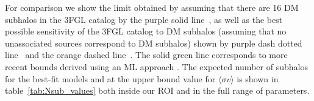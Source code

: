 \documentclass[12pt, a4paper]{article}
\newcommand{\dima}[1]{\textcolor{purple}{{Dima: #1}}}
\begin{document}

For comparison we show the limit obtained by assuming that there are 16 DM subhalos in the 3FGL catalog by the purple solid line~\cite{2019Galax...7...90C},
as well as the best possible sensitivity of the 3FGL catalog to DM subhalos (assuming that no unassociated sources correspond to DM subhalos) shown by purple dash dotted line~\cite{2019Galax...7...90C}
and the orange dashed line~\cite{2019JCAP...11..045C}. The solid green line corresponds to more recent bounds derived using an ML approach \cite{2023JCAP...07..033B}. 
The expected number of subhalos for the best-fit models and at the upper bound value for 
$\langle \sigma v \rangle$
is shown in table~\ref{tab:Nsub_values} both inside our ROI and in the full range of parameters.
\end{document}
